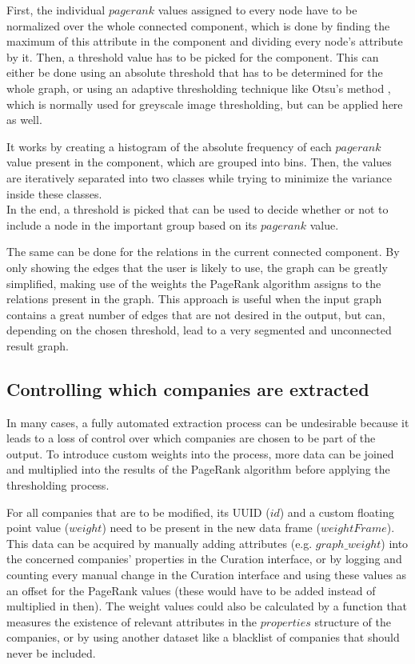 \documentclass[
        a4paper,     %
        titlepage,   %
        oneside,     %
        parskip      %
        ]{scrartcl}  %
\begin{document}
  First, the individual $pagerank$ values assigned to every node have to be normalized
  over the whole connected component, which is done by finding the maximum of this
  attribute in the component and dividing every node's attribute by it.
  Then, a threshold value has to be picked for the component. This can either be done
  using an absolute threshold that has to be determined for the whole graph, or
  using an adaptive thresholding technique like Otsu's method \cite{otsu1979threshold},
  which is normally used for greyscale image thresholding, but can be applied here as well.

  It works by creating a histogram of the absolute frequency of
  each $pagerank$ value present in the component, which are grouped into bins.
  Then, the values are iteratively separated into two classes while trying to
  minimize the variance inside these classes.\\
  In the end, a threshold is picked that can be used to decide whether or not to
  include a node in the important group based on its $pagerank$ value.

  The same can be done for the relations in the current connected component.
  By only showing the edges that the user is likely to use, the graph can be greatly
  simplified, making use of the weights the PageRank algorithm assigns to the
  relations present in the graph. This approach is useful when the input graph
  contains a great number of edges that are not desired in the output, but can,
  depending on the chosen threshold, lead to a very segmented and unconnected result graph.

  \subsection{Controlling which companies are extracted}
  In many cases, a fully automated extraction process can be undesirable because
  it leads to a loss of control over which companies are chosen to be part of the
  output. To introduce custom weights into the process, more data can be joined and multiplied
  into the results of the PageRank algorithm before applying the thresholding process.

  For all companies that are to be modified, its UUID ($id$) and a custom floating point
  value ($weight$) need to be present in the new data frame ($weightFrame$).
  This data can be acquired by manually adding attributes (e.g. $graph\_weight$)
  into the concerned companies' properties in the Curation interface, or by logging and counting
  every manual change in the Curation interface and using these values as an offset for the
  PageRank values (these would have to be added instead of multiplied in then).
  The weight values could also be calculated by a function that measures the existence
  of relevant attributes in the $properties$ structure of the companies, or by
  using another dataset like a blacklist of companies that should never be included.
\end{document}
